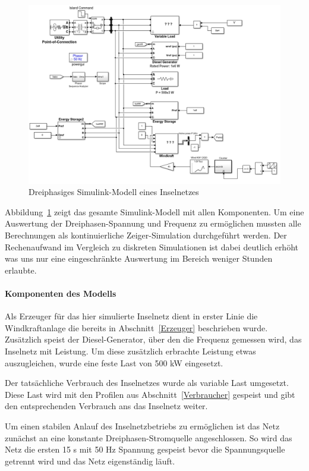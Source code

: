 \begin{figure}[h!]
	\centering
	\includegraphics[width=14cm]{Abbildungen/Dreiphasig.png}
	\caption{Dreiphasiges Simulink-Modell eines Inselnetzes}\label{Mod:3phase}
\end{figure}

Abbildung~\ref{Mod:3phase} zeigt das gesamte Simulink-Modell mit allen Komponenten.
Um eine Auswertung der Dreiphasen-Spannung und Frequenz zu ermöglichen mussten alle Berechnungen als kontinuierliche Zeiger-Simulation 
durchgeführt werden.
Der Rechenaufwand im Vergleich zu diskreten Simulationen ist dabei deutlich erhöht was uns nur eine eingeschränkte
Auswertung im Bereich weniger Stunden erlaubte.

\paragraph{Komponenten des Modells}
Als Erzeuger für das hier simulierte Inselnetz dient in erster Linie die Windkraftanlage die bereits in Abschnitt~\ref{Erzeuger} beschrieben wurde.
Zusätzlich speist der Diesel-Generator, über den die Frequenz gemessen wird, das Inselnetz mit Leistung.
Um diese zusätzlich erbrachte Leistung etwas auszugleichen, wurde eine feste Last von 500 kW eingesetzt.

Der tatsächliche Verbrauch des Inselnetzes wurde als variable Last umgesetzt.
Diese Last wird mit den Profilen aus Abschnitt~\ref{Verbraucher} gespeist und gibt den entsprechenden Verbrauch ans das Inselnetz
weiter.

Um einen stabilen Anlauf des Inselnetzbetriebs zu ermöglichen ist das Netz zunächst an eine konstante Dreiphasen-Stromquelle 
angeschlossen. 
So wird das Netz die ersten 15 s mit 50 Hz Spannung gespeist bevor die Spannungsquelle getrennt wird und das Netz 
eigenständig läuft.

